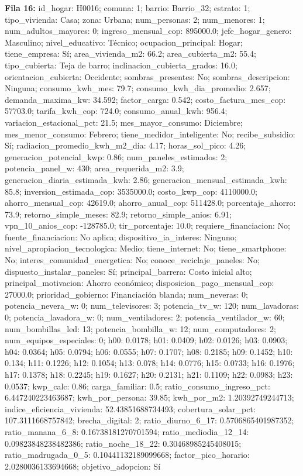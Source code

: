 {\footnotesize\textbf{Fila 16:} id\_hogar: H0016; comuna: 1; barrio: Barrio\_32; estrato: 1; tipo\_vivienda: Casa; zona: Urbana; num\_personas: 2; num\_menores: 1; num\_adultos\_mayores: 0; ingreso\_mensual\_cop: 895000.0; jefe\_hogar\_genero: Masculino; nivel\_educativo: Técnico; ocupacion\_principal: Hogar; tiene\_empresa: Sí; area\_vivienda\_m2: 66.2; area\_cubierta\_m2: 55.4; tipo\_cubierta: Teja de barro; inclinacion\_cubierta\_grados: 16.0; orientacion\_cubierta: Occidente; sombras\_presentes: No; sombras\_descripcion: Ninguna; consumo\_kwh\_mes: 79.7; consumo\_kwh\_dia\_promedio: 2.657; demanda\_maxima\_kw: 34.592; factor\_carga: 0.542; costo\_factura\_mes\_cop: 57703.0; tarifa\_kwh\_cop: 724.0; consumo\_anual\_kwh: 956.4; variacion\_estacional\_pct: 21.5; mes\_mayor\_consumo: Diciembre; mes\_menor\_consumo: Febrero; tiene\_medidor\_inteligente: No; recibe\_subsidio: Sí; radiacion\_promedio\_kwh\_m2\_dia: 4.17; horas\_sol\_pico: 4.26; generacion\_potencial\_kwp: 0.86; num\_paneles\_estimados: 2; potencia\_panel\_w: 430; area\_requerida\_m2: 3.9; generacion\_diaria\_estimada\_kwh: 2.86; generacion\_mensual\_estimada\_kwh: 85.8; inversion\_estimada\_cop: 3535000.0; costo\_kwp\_cop: 4110000.0; ahorro\_mensual\_cop: 42619.0; ahorro\_anual\_cop: 511428.0; porcentaje\_ahorro: 73.9; retorno\_simple\_meses: 82.9; retorno\_simple\_anios: 6.91; vpn\_10\_anios\_cop: -128785.0; tir\_porcentaje: 10.0; requiere\_financiacion: No; fuente\_financiacion: No aplica; dispositivo\_ia\_interes: Ninguno; nivel\_apropiacion\_tecnologica: Medio; tiene\_internet: No; tiene\_smartphone: No; interes\_comunidad\_energetica: No; conoce\_reciclaje\_paneles: No; dispuesto\_instalar\_paneles: Sí; principal\_barrera: Costo inicial alto; principal\_motivacion: Ahorro económico; disposicion\_pago\_mensual\_cop: 27000.0; prioridad\_gobierno: Financiación blanda; num\_neveras: 0; potencia\_nevera\_w: 0; num\_televisores: 3; potencia\_tv\_w: 120; num\_lavadoras: 0; potencia\_lavadora\_w: 0; num\_ventiladores: 2; potencia\_ventilador\_w: 60; num\_bombillas\_led: 13; potencia\_bombilla\_w: 12; num\_computadores: 2; num\_equipos\_especiales: 0; h00: 0.0178; h01: 0.0409; h02: 0.0126; h03: 0.0903; h04: 0.0364; h05: 0.0794; h06: 0.0555; h07: 0.1707; h08: 0.2185; h09: 0.1452; h10: 0.134; h11: 0.1226; h12: 0.1054; h13: 0.078; h14: 0.0776; h15: 0.0733; h16: 0.1976; h17: 0.1378; h18: 0.2245; h19: 0.1627; h20: 0.2131; h21: 0.1109; h22: 0.0983; h23: 0.0537; kwp\_calc: 0.86; carga\_familiar: 0.5; ratio\_consumo\_ingreso\_pct: 6.447240223463687; kwh\_por\_persona: 39.85; kwh\_por\_m2: 1.20392749244713; indice\_eficiencia\_vivienda: 52.43851688734493; cobertura\_solar\_pct: 107.3111668757842; brecha\_digital: 2; ratio\_diurno\_6\_17: 0.5706865401987352; ratio\_manana\_6\_8: 0.16738181270701594; ratio\_mediodia\_12\_14: 0.09823848238482386; ratio\_noche\_18\_22: 0.30468985245408015; ratio\_madrugada\_0\_5: 0.10441132189099668; factor\_pico\_horario: 2.0280036133694668; objetivo\_adopcion: Sí\par}
